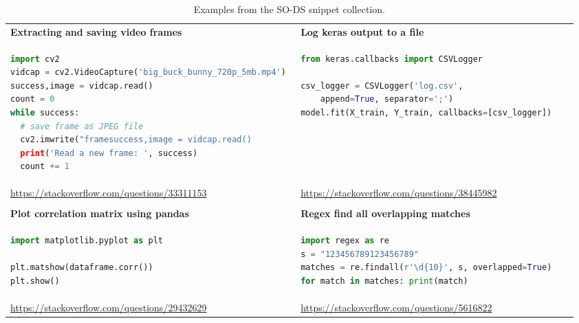 \documentclass[12pt,conference, onecolumn]{IEEEtran}
\begin{document}
\begin{table}
\small

\begin{tabular}{p{0.48\linewidth} | p{0.48\linewidth}}


\textbf{Extracting and saving video frames} & \textbf{Log keras output to a file}\\




\begin{lstlisting}[language=Python]
import cv2
vidcap = cv2.VideoCapture('big_buck_bunny_720p_5mb.mp4')
success,image = vidcap.read()
count = 0
while success:
  # save frame as JPEG file   
  cv2.imwrite("framesuccess,image = vidcap.read()
  print('Read a new frame: ', success)
  count += 1
\end{lstlisting}
& 
\begin{lstlisting}[language=Python]
from keras.callbacks import CSVLogger

csv_logger = CSVLogger('log.csv', 
	append=True, separator=';')
model.fit(X_train, Y_train, callbacks=[csv_logger])
\end{lstlisting}
\\
\url{https://stackoverflow.com/questions/33311153} &\url{https://stackoverflow.com/questions/38445982} \\
\midrule
&\\
\textbf{Plot correlation matrix using pandas} & \textbf{Regex find all overlapping matches} \\

\begin{lstlisting}[language=Python]
import matplotlib.pyplot as plt

plt.matshow(dataframe.corr())
plt.show()
\end{lstlisting}& 
\begin{lstlisting}[language=Python]
import regex as re
s = "123456789123456789"
matches = re.findall(r'\d{10}', s, overlapped=True)
for match in matches: print(match)
\end{lstlisting}
\\
 \url{https://stackoverflow.com/questions/29432629} & \url{https://stackoverflow.com/questions/5616822} \\
\end{tabular}
\caption{Examples from the SO-DS snippet collection. }\label{tab:example_snippets}
\end{table}
 
\end{document}
